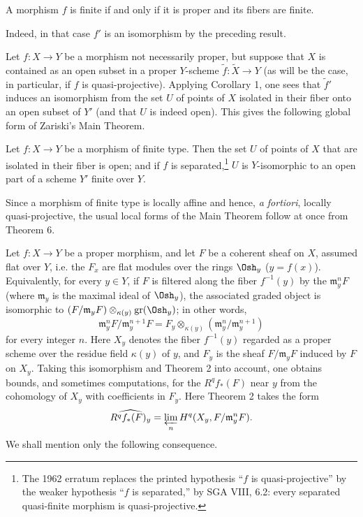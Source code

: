  A morphism $f$ is finite if and only if it is proper and
its fibers are finite.

Indeed, in that case $f'$ is an isomorphism by the preceding result.

Let $f:X\longrightarrow Y$ be a morphism not necessarily proper, but suppose
that $X$ is contained as an open subset in a proper $Y$-scheme
$\widetilde f:\widetilde X\longrightarrow Y$ (as will be the case, in
particular, if $f$ is quasi-projective). Applying Corollary 1, one sees that
$\widetilde f'$ induces an isomorphism from the set $U$ of points of $X$
isolated in their fiber onto an open subset of $Y'$ (and that $U$ is indeed
open). This gives the following global form of Zariski's Main Theorem.

 Let
$f:X\longrightarrow Y$ be a morphism of finite type. Then the set $U$ of
points of $X$ that are isolated in their fiber is open; and if $f$ is
separated,\footnote{The 1962 erratum replaces the printed hypothesis “$f$ is
quasi-projective” by the weaker hypothesis “$f$ is separated,” by SGA VIII,
6.2: every separated quasi-finite morphism is quasi-projective.} $U$ is
$Y$-isomorphic to an open part of a scheme $Y'$ finite over $Y$.

Since a morphism of finite type is locally affine and hence,
\textit{a fortiori}, locally quasi-projective, the usual local forms of the
Main Theorem follow at once from Theorem 6.


Let $f:X\longrightarrow Y$ be a proper morphism, and let $F$ be a coherent
sheaf on $X$, assumed flat over $Y$, i.e. the $F_x$ are flat modules over the
rings $\Osh_y$ ($y=f(x)$). Equivalently, for every $y\in Y$, if $F$ is
filtered along the fiber $f^{-1}(y)$ by the $\mathfrak m_y^nF$ (where
$\mathfrak m_y$ is the maximal ideal of $\Osh_y$), the associated graded
object is isomorphic to
$(F/\mathfrak m_yF)\otimes_{\kappa(y)}\operatorname{gr}(\Osh_y)$; in other
words,
\[
  \mathfrak m_y^nF/\mathfrak m_y^{n+1}F
  =F_y\otimes_{\kappa(y)}
  (\mathfrak m_y^n/\mathfrak m_y^{n+1})
\]
for every integer $n$. Here $X_y$ denotes the fiber $f^{-1}(y)$ regarded as a
proper scheme over the residue field $\kappa(y)$ of $y$, and $F_y$ is the
sheaf $F/\mathfrak m_yF$ induced by $F$ on $X_y$. Taking this isomorphism and
Theorem 2 into account, one obtains bounds, and sometimes computations, for
the $R^qf_*(F)$ near $y$ from the cohomology of $X_y$ with coefficients in
$F_y$. Here Theorem 2 takes the form
\[
  \widehat{R^qf_*(F)_y}
  =\varprojlim_n H^q(X_y,F/\mathfrak m_y^nF).
\]
We shall mention only the following consequence.

